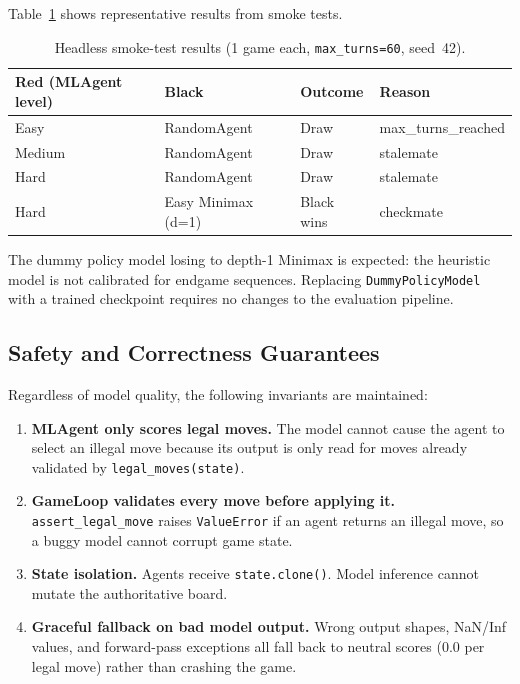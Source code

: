 Table~\ref{tab:results} shows representative results from smoke tests.

\begin{table}[H]
\centering
\caption{Headless smoke-test results (1 game each, \texttt{max\_turns=60}, seed~42).}
\label{tab:results}
\begin{tabular}{llll}
\toprule
\textbf{Red (MLAgent level)} & \textbf{Black} &
\textbf{Outcome} & \textbf{Reason} \\
\midrule
Easy   & RandomAgent       & Draw       & max\_turns\_reached \\
Medium & RandomAgent       & Draw       & stalemate \\
Hard   & RandomAgent       & Draw       & stalemate \\
Hard   & Easy Minimax (d=1) & Black wins & checkmate \\
\bottomrule
\end{tabular}
\end{table}

The dummy policy model losing to depth-1 Minimax is expected: the
heuristic model is not calibrated for endgame sequences.  Replacing
\texttt{DummyPolicyModel} with a trained checkpoint requires no changes
to the evaluation pipeline.

\subsection{Safety and Correctness Guarantees}
\label{sec:safety}

Regardless of model quality, the following invariants are maintained:

\begin{enumerate}[leftmargin=*]
  \item \textbf{MLAgent only scores legal moves.}
        The model cannot cause the agent to select an illegal move
        because its output is only read for moves already validated
        by \texttt{legal\_moves(state)}.
  \item \textbf{GameLoop validates every move before applying it.}
        \texttt{assert\_legal\_move} raises \texttt{ValueError} if an
        agent returns an illegal move, so a buggy model cannot corrupt
        game state.
  \item \textbf{State isolation.}
        Agents receive \texttt{state.clone()}.
        Model inference cannot mutate the authoritative board.
  \item \textbf{Graceful fallback on bad model output.}
        Wrong output shapes, NaN/Inf values, and forward-pass exceptions
        all fall back to neutral scores (0.0 per legal move) rather than
        crashing the game.
\end{enumerate}


